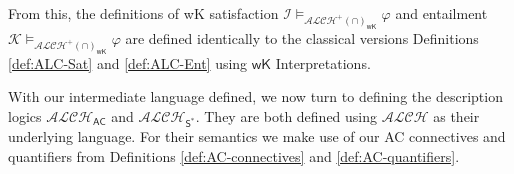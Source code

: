 \documentclass[letterpaper]{article} %
\theoremstyle{definition}
\theoremstyle{definition}
\newtheorem{definition}{Definition}
\theoremstyle{definition}
\theoremstyle{definition}
\theoremstyle{definition}
\newcommand{\vt}{\mathfrak{t}}
\begin{document}
\noindent From this, the definitions of \textsf{wK} satisfaction $\mathcal{I}\models_{\mathcal{ALCH^+(\cap)}_\mathsf{wK}}\varphi$ and entailment $\mathcal{K}\models_{\mathcal{ALCH^+(\cap)}_\mathsf{wK}}\varphi$ are defined identically to the classical versions Definitions \ref{def:ALC-Sat} and \ref{def:ALC-Ent} using $\mathsf{wK}$ Interpretations.

With our intermediate language defined, we now turn to defining the description logics $\mathcal{ALCH}_\mathsf{AC}$ and $\mathcal{ALCH}_{\mathsf{S}^*}$. They are both defined using $\mathcal{ALCH}$ as their underlying language. For their semantics we make use of our AC connectives and quantifiers from Definitions \ref{def:AC-connectives} and \ref{def:AC-quantifiers}.
\end{document}
